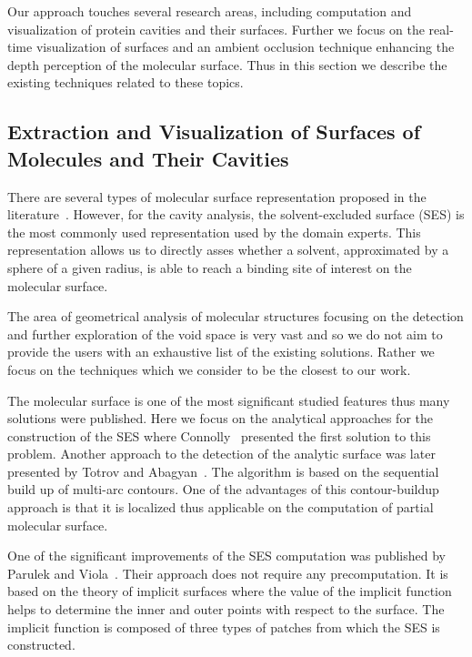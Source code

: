 Our approach touches several research areas, including computation and visualization of protein cavities and their surfaces. 
Further we focus on the real-time visualization of surfaces and an ambient occlusion technique enhancing the depth perception of the molecular surface. 
Thus in this section we describe the existing techniques related to these topics.

\subsection{Extraction and Visualization of Surfaces of Molecules and Their Cavities}
There are several types of molecular surface representation proposed in the literature~\cite{STAR2015}. 
However, for the cavity analysis,  the solvent-excluded surface (SES) is the most commonly used representation used by the domain experts.%
This representation allows us to directly asses whether a solvent, approximated by a sphere of a given radius, is able to reach a binding site of interest on the molecular surface. 

The area of geometrical analysis of molecular structures focusing on the detection and further exploration of the void space is very vast and so we do not aim to provide the users with an exhaustive list of the existing solutions. 
Rather we focus on the techniques which we consider to be the closest to our work.

The molecular surface is one of the most significant studied features thus many solutions were published.
Here we focus on the analytical approaches for the construction of the SES where Connolly~\cite{connolly1983analytical} presented the first solution to this problem.
Another approach to the detection of the analytic surface was later presented by Totrov and Abagyan~\cite{totrov1996contour}.
The algorithm is based on the sequential build up of multi-arc contours. 
One of the advantages of this contour-buildup approach is that it is localized thus applicable on the computation of partial molecular surface.

One of the significant improvements of the SES computation was published by Parulek and Viola~\cite{parulek2012implicit}.
Their approach does not require any precomputation. 
It is based on the theory of implicit surfaces where the value of the implicit function helps to determine the inner and outer points with respect to the surface.
The implicit function is composed of three types of patches from which the SES is constructed.

